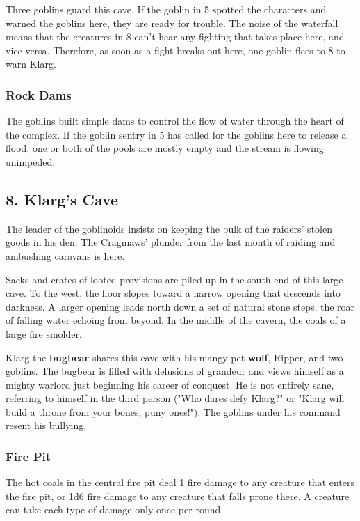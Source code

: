 \documentclass[10pt,a4paper,twoside,bg=print,twocolumn,openany,nodeprecatedcode]{dndbook}
\begin{document}
Three goblins guard this cave. If the goblin in 5 spotted the characters and warned the goblins here, they are ready for trouble. The noise of the waterfall means that the creatures in 8 can't hear any fighting that takes place here, and vice versa. Therefore, as soon as a fight breaks out here, one goblin flees to 8 to warn Klarg.

\subsubsection{Rock Dams}
The goblins built simple dams to control the flow of water through the heart of the complex. If the goblin sentry in 5 has called for the goblins here to release a flood, one or both of the pools are mostly empty and the stream is flowing unimpeded.

\subsection{8. Klarg's Cave}
The leader of the goblinoids insists on keeping the bulk of the raiders' stolen goods in his den. The Cragmaws' plunder from the last month of raiding and ambushing caravans is here.

\begin{DndReadAloud}{}
Sacks and crates of looted provisions are piled up in the south end of this large cave. To the west, the floor slopes toward a narrow opening that descends into darkness. A larger opening leads north down a set of natural stone steps, the roar of falling water echoing from beyond. In the middle of the cavern, the coals of a large fire smolder.

\end{DndReadAloud}

Klarg the \textbf{bugbear} shares this cave with his mangy pet \textbf{wolf}, Ripper, and two goblins. The bugbear is filled with delusions of grandeur and views himself as a mighty warlord just beginning his career of conquest. He is not entirely sane, referring to himself in the third person ("Who dares defy Klarg?" or "Klarg will build a throne from your bones, puny ones!"). The goblins under his command resent his bullying.

\subsubsection{Fire Pit}
The hot coals in the central fire pit deal 1 fire damage to any creature that enters the fire pit, or 1d6 fire damage to any creature that falls prone there. A creature can take each type of damage only once per round.
\end{document}
